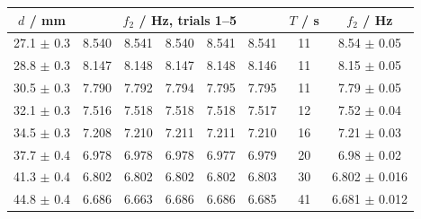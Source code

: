 \begin{tabular}{@{}cccccccc@{}}
\toprule
$d$ / mm & \multicolumn{5}{c}{$f_2$ / Hz, trials 1--5} & $T$ / s & $f_2$ / Hz \\
\midrule
27.1 $\pm$ 0.3 & 8.540 & 8.541 & 8.540 & 8.541 & 8.541 & 11 & 8.54 $\pm$ 0.05 \\
28.8 $\pm$ 0.3 & 8.147 & 8.148 & 8.147 & 8.148 & 8.146 & 11 & 8.15 $\pm$ 0.05 \\
30.5 $\pm$ 0.3 & 7.790 & 7.792 & 7.794 & 7.795 & 7.795 & 11 & 7.79 $\pm$ 0.05 \\
32.1 $\pm$ 0.3 & 7.516 & 7.518 & 7.518 & 7.518 & 7.517 & 12 & 7.52 $\pm$ 0.04 \\
34.5 $\pm$ 0.3 & 7.208 & 7.210 & 7.211 & 7.211 & 7.210 & 16 & 7.21 $\pm$ 0.03 \\
37.7 $\pm$ 0.4 & 6.978 & 6.978 & 6.978 & 6.977 & 6.979 & 20 & 6.98 $\pm$ 0.02 \\
41.3 $\pm$ 0.4 & 6.802 & 6.802 & 6.802 & 6.802 & 6.803 & 30 & 6.802 $\pm$ 0.016 \\
44.8 $\pm$ 0.4 & 6.686 & 6.663 & 6.686 & 6.686 & 6.685 & 41 & 6.681 $\pm$ 0.012 \\
\bottomrule
\end{tabular}